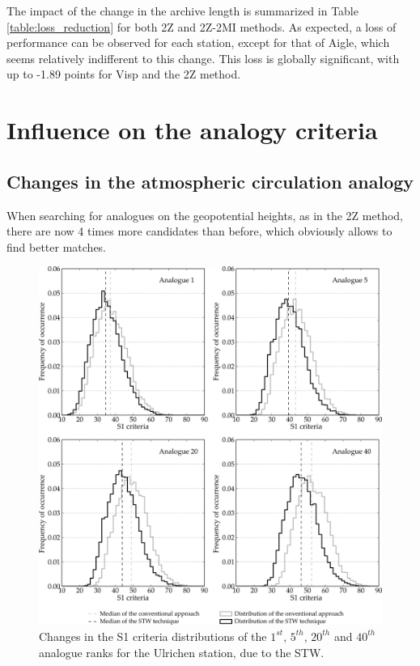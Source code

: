 \documentclass[hess]{copernicus}
\begin{document}
The impact of the change in the archive length is summarized in Table \ref{table:loss_reduction} for both 2Z and 2Z-2MI methods. As expected, a loss of performance can be observed for each station, except for that of Aigle, which seems relatively indifferent to this change. This loss is globally significant, with up to -1.89 points for Visp and the 2Z method. 


\section{Influence on the analogy criteria}

\subsection{Changes in the atmospheric circulation analogy}

When searching for analogues on the geopotential heights, as in the 2Z method, there are now 4 times more candidates than before, which obviously allows to find better matches.

\begin{figure}[htb]
	\begin{center}
		\includegraphics[width=15cm]{figures/changes_S1_analogues.png}
	\end{center}
	\caption{Changes in the S1 criteria distributions of the $1^{st}$, $5^{th}$, $20^{th}$ and $40^{th}$ analogue ranks for the Ulrichen station, due to the STW.}
	\label{fig:changes_S1_analogues}
\end{figure}
\end{document}
